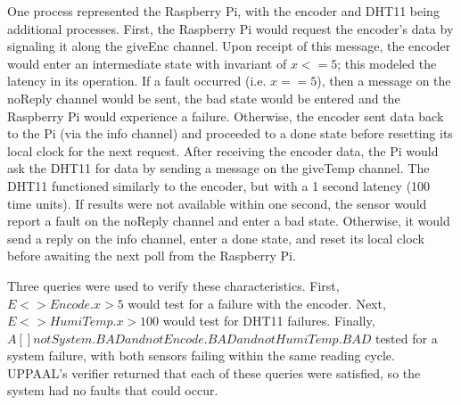 \documentclass[letterpaper, 12pt]{article}
\begin{document}
\indent One process represented the Raspberry Pi, with the encoder and DHT11 being additional processes.  First, the Raspberry Pi would request the encoder's data by signaling it along the giveEnc channel.  Upon receipt of this message, the encoder would enter an intermediate state with invariant of $x <= 5$; this modeled the latency in its operation.  If a fault occurred (i.e. $x == 5$), then a message on the noReply channel would be sent, the bad state would be entered and the Raspberry Pi would experience a failure.  Otherwise, the encoder sent data back to the Pi (via the info channel) and proceeded to a done state before resetting its local clock for the next request.  After receiving the encoder data, the Pi would ask the DHT11 for data by sending a message on the giveTemp channel.  The DHT11 functioned similarly to the encoder, but with a 1 second latency (100 time units).  If results were not available within one second, the sensor would report a fault on the noReply channel and enter a bad state.  Otherwise, it would send a reply on the info channel, enter a done state, and reset its local clock before awaiting the next poll from the Raspberry Pi.

\indent Three queries were used to verify these characteristics.  First, $E <> Encode.x > 5$ would test for a failure with the encoder.  Next, $E <> HumiTemp.x > 100$ would test for DHT11 failures.  Finally, $A[] not System.BAD and not Encode.BAD and not HumiTemp.BAD$ tested for a system failure, with both sensors failing within the same reading cycle.  UPPAAL's verifier returned that each of these queries were satisfied, so the system had no faults that could occur.
\end{document}
